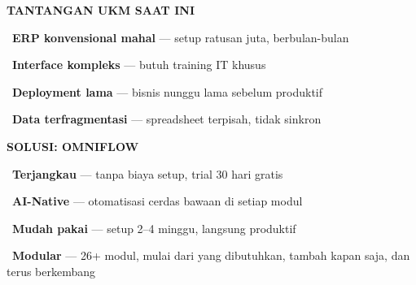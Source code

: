 \documentclass[a4paper]{article}
\begin{document}
\noindent
\begin{minipage}[t]{0.485\textwidth}
    \colorbox{RedLight}{%
        \begin{minipage}{\dimexpr\textwidth-2\fboxsep\relax}
            {\fontsize{10}{13}\selectfont\bfseries\color{RedText} TANTANGAN UKM SAAT INI}
        \end{minipage}}\par
    \vspace{4pt}

    {\fontsize{9.5}{13}\selectfont\color{TextDark}%
    \textbullet\ \textbf{ERP konvensional mahal} — setup ratusan juta, berbulan-bulan\par\vspace{4pt}%
    \textbullet\ \textbf{Interface kompleks} — butuh training IT khusus\par\vspace{4pt}%
    \textbullet\ \textbf{Deployment lama} — bisnis nunggu lama sebelum produktif\par\vspace{4pt}%
    \textbullet\ \textbf{Data terfragmentasi} — spreadsheet terpisah, tidak sinkron}%
\end{minipage}%
\hfill%
\begin{minipage}[t]{0.485\textwidth}
    \colorbox{BluePrimary}{%
        \begin{minipage}{\dimexpr\textwidth-2\fboxsep\relax}
            {\fontsize{10}{13}\selectfont\bfseries\color{White} SOLUSI: OMNIFLOW}
        \end{minipage}}\par
    \vspace{4pt}

    {\fontsize{9.5}{13}\selectfont\color{TextDark}%
    \textbullet\ \textbf{Terjangkau} — tanpa biaya setup, trial 30 hari gratis\par\vspace{4pt}%
    \textbullet\ \textbf{AI-Native} — otomatisasi cerdas bawaan di setiap modul\par\vspace{4pt}%
    \textbullet\ \textbf{Mudah pakai} — setup 2--4 minggu, langsung produktif\par\vspace{4pt}%
    \textbullet\ \textbf{Modular} — 26+ modul, mulai dari yang dibutuhkan, tambah kapan saja, dan terus berkembang}%
\end{minipage}

\vspace{8pt}
\end{document}
